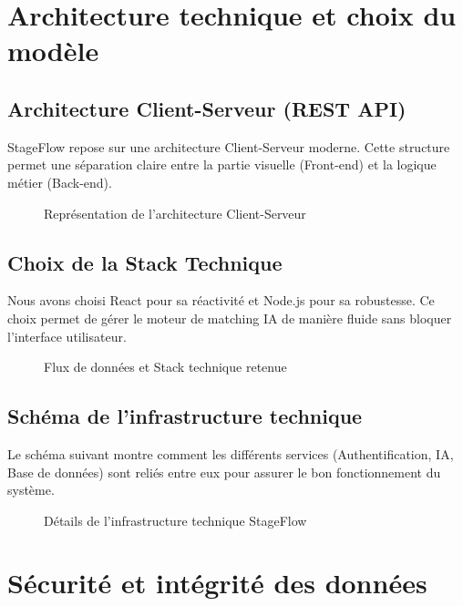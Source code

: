 \section{Architecture technique et choix du modèle}

\subsection{Architecture Client-Serveur (REST API)}
StageFlow repose sur une architecture Client-Serveur moderne. Cette structure permet une séparation claire entre la partie visuelle (Front-end) et la logique métier (Back-end). 

\begin{figure}[H]
    \centering
    \caption{Représentation de l'architecture Client-Serveur}
\end{figure}

\subsection{Choix de la Stack Technique}
Nous avons choisi React pour sa réactivité et Node.js pour sa robustesse. Ce choix permet de gérer le moteur de matching IA de manière fluide sans bloquer l'interface utilisateur.

\begin{figure}[H]
    \centering
    \caption{Flux de données et Stack technique retenue}
\end{figure}

\subsection{Schéma de l'infrastructure technique}
Le schéma suivant montre comment les différents services (Authentification, IA, Base de données) sont reliés entre eux pour assurer le bon fonctionnement du système.

\begin{figure}[H]
    \centering
    \caption{Détails de l'infrastructure technique StageFlow}
\end{figure}

\section{Sécurité et intégrité des données}

